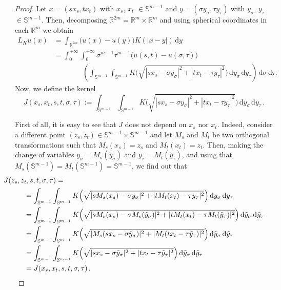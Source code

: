 \documentclass[12pt,reqno]{amsart}
\theoremstyle{definition}
\theoremstyle{remark}
\newcommand{\con}[1]{\mathbb{#1}}
\newcommand{\R}{\con{R}} %
\newcommand{\Sph}{\con{S}} %
\renewcommand{\d}{\,\mathrm{d}} %
\newcommand{\bpar}[1]{\left ( {#1}\right )}
\numberwithin{equation}{section}
\begin{document}
\begin{proof}
	Let $x = (s x_s, t x_t)$ with $x_s$, $x_t$ $\in \Sph^{m-1}$ and $y = (\sigma y_\sigma, \tau
	y_\tau)$ with $y_\sigma$, $y_\tau$ $\in \Sph^{m-1}$. Then, decomposing $\R^{2m} = \R^m \times \R^m$
	and using spherical coordinates in each $\R^m$ we obtain
	\begin{align*}
	L_Ku(x) &= \int_{\R^{2m}} \big( u(x) - u(y)\big) K( |x-y|) \d y &\\
	&= \int_0^{+\infty}  \int_0^{+\infty} \sigma^{m-1} \tau^{m-1} \big(u(s,t) - u(\sigma, \tau)\big)  \\
	&\quad \quad \quad \quad  \bpar{\int_{\Sph^{m-1}}  \int_{\Sph^{m-1}} K \Big( \sqrt{|sx_s - \sigma y_\sigma|^2 + |t x_t - \tau y_\tau|^2 } \Big) \d y_\sigma \d y_\tau } \d \sigma \d \tau .
	\end{align*}
	Now, we define the kernel
	\begin{equation}
	\label{Eq:KernelSTVariablesProof1}
	J(x_s, x_t, s,t,\sigma, \tau) := \int_{\Sph^{m-1}}  \int_{\Sph^{m-1}} K \Big( \sqrt{|sx_s - \sigma y_\sigma|^2 + |t x_t - \tau y_\tau|^2 }\Big ) \d y_\sigma \d y_\tau \,.
	\end{equation}
	
	First of all, it is easy to see that $J$ does not depend on $x_s$ nor $x_t$. Indeed, consider a different point $(z_s, z_t)\in \Sph^{m-1} \times \Sph^{m-1}$ and let $M_s$ and $M_t$ be two orthogonal transformations such that $M_s(x_s) = z_s$ and $M_t(x_t) = z_t$. Then, making the change of variables $y_\sigma = M_s(\tilde{y}_\sigma)$ and $y_\tau = M_t(\tilde{y}_\tau)$, and using that $M_s( \Sph^{m-1}) = M_t(\Sph^{m-1}) = \Sph^{m-1}$, we find out that
	\begin{align*}
	& \hspace{-1cm} J(z_s, z_t, s,t,\sigma, \tau) = \\
	&= \int_{\Sph^{m-1}}  \int_{\Sph^{m-1}} K \Big( \sqrt{|s M_s(x_s) - \sigma y_\sigma|^2 + |t M_t(x_t) - \tau y_\tau|^2 }\Big) \d y_\sigma \d y_\tau \\
	&= \int_{\Sph^{m-1}}  \int_{\Sph^{m-1}} K \Big( \sqrt{|s M_s(x_s) - \sigma M_s(\tilde{y}_\sigma)|^2 + |t M_t(x_t) - \tau M_t(\tilde{y}_\tau)|^2 }\Big) \d \tilde{y}_\sigma \d \tilde{y}_\tau \\
	&= \int_{\Sph^{m-1}}  \int_{\Sph^{m-1}} K\Big ( \sqrt{|M_s(sx_s - \sigma \tilde{y}_\sigma)|^2 + |M_t(t x_t - \tau \tilde{y}_\tau)|^2 }\Big) \d \tilde{y}_\sigma \d \tilde{y}_\tau \\
	&= \int_{\Sph^{m-1}}  \int_{\Sph^{m-1}} K\Big ( \sqrt{|sx_s - \sigma \tilde{y}_\sigma|^2 + |t x_t - \tau \tilde{y}_\tau|^2 }\Big) \d \tilde{y}_\sigma \d \tilde{y}_\tau \\
	&= J(x_s, x_t, s,t,\sigma, \tau) \,.
	\end{align*}
	

\end{proof}
\end{document}
